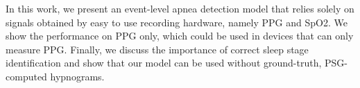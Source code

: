 In this work, we present an event-level apnea detection model that relies solely on signals obtained by easy to use recording hardware, namely PPG and SpO2. We show the performance on PPG only, which could be used in devices that can only measure PPG. Finally, we discuss the importance of correct sleep stage identification and show that our model can be used without ground-truth, PSG-computed hypnograms.
